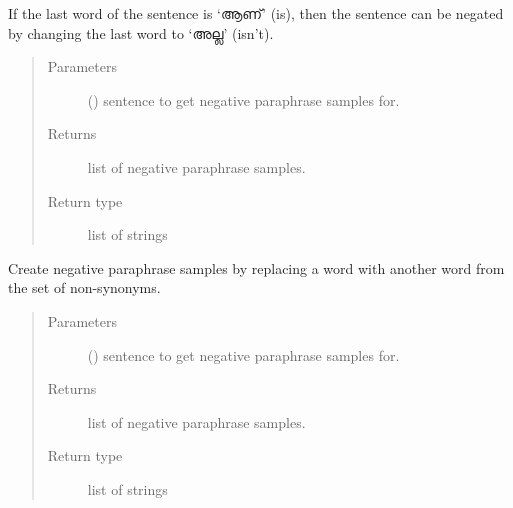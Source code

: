 \documentclass[letterpaper,10pt,english]{sphinxmanual}
\begin{document}
\begin{fulllineitems}
\begin{fulllineitems}
\label{\detokenize{ParaphraseDatasetCreation.Malayalam:ParaphraseDatasetCreation.Malayalam.Negative.NegativeParaphrases.negate_if_last_word_is_is}}
If the last word of the sentence is ‘ആണ്‌’ (is), then the sentence can be
negated by changing the last word to ‘അല്ല’ (isn’t).
\begin{quote}\begin{description}
\item[{Parameters}] \leavevmode
{} () \textendash{} sentence to get negative paraphrase samples for.

\item[{Returns}] \leavevmode
list of negative paraphrase samples.

\item[{Return type}] \leavevmode
list of strings

\end{description}\end{quote}

\end{fulllineitems}


\begin{fulllineitems}
\label{\detokenize{ParaphraseDatasetCreation.Malayalam:ParaphraseDatasetCreation.Malayalam.Negative.NegativeParaphrases.subst_with_non_synonyms}}
Create negative paraphrase samples by replacing a word with another word 
from the set of non-synonyms.
\begin{quote}\begin{description}
\item[{Parameters}] \leavevmode
{} () \textendash{} sentence to get negative paraphrase samples for.

\item[{Returns}] \leavevmode
list of negative paraphrase samples.

\item[{Return type}] \leavevmode
list of strings

\end{description}\end{quote}

\end{fulllineitems}


\end{fulllineitems}
\end{document}
